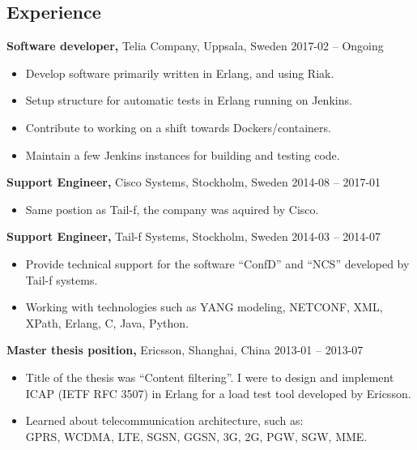 \documentclass[margin]{res}
\begin{document}

\address{{\bf Contact information}\\

linkedin.com/in/tommymattsson\\
github.com/Taddic\\
}

\address{{\bf Address}\\
  \\
}

\begin{resume}

\section{Experience}
{\bf Software developer,} Telia Company, Uppsala, Sweden \hfill 2017-02 -- Ongoing
 \begin{itemize} \itemsep -2pt  %
 \item Develop software primarily written in Erlang, and using Riak.
 \item Setup structure for automatic tests in Erlang running on Jenkins.
 \item Contribute to working on a shift towards Dockers/containers.
 \item Maintain a few Jenkins instances for building and testing code.
 \end{itemize}

{\bf Support Engineer,} Cisco Systems, Stockholm, Sweden \hfill 2014-08 -- 2017-01
 \begin{itemize} \itemsep -2pt  %
 \item Same postion as Tail-f, the company was aquired by Cisco.
 \end{itemize}

{\bf Support Engineer,} Tail-f Systems, Stockholm, Sweden \hfill 2014-03 -- 2014-07
 \begin{itemize} \itemsep -2pt  %
 \item Provide technical support for the software ``ConfD'' and ``NCS''
   developed by Tail-f systems.
 \item Working with technologies such as YANG modeling, NETCONF,
   XML, XPath, Erlang, C, Java, Python.
 \end{itemize}

{\bf Master thesis position,} Ericsson, Shanghai, China \hfill 2013-01 -- 2013-07
 \begin{itemize} \itemsep -2pt  %
 \item Title of the thesis was ``Content filtering''. I were to design
   and implement ICAP (IETF RFC 3507) in Erlang for a load test tool
   developed by Ericsson.
 \item Learned about telecommunication architecture, such as: \\
 GPRS, WCDMA, LTE, SGSN, GGSN, 3G, 2G, PGW, SGW, MME.
 \end{itemize}


\end{resume}
\end{document}
